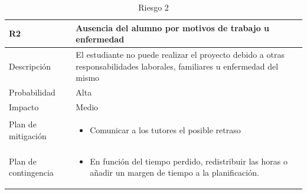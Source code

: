 \begin{table}[!htb]
    \footnotesize
    \begin{tabular}{|>{\arraybackslash}m{3.15cm} | >{\arraybackslash}m{10cm} |}
        \hline
        \vspace{0.5em} \textbf{ R2 } \vspace{0.5em} & \vspace{0.5em} \textbf{Ausencia del alumno por motivos de trabajo u enfermedad} \vspace{0.5em} \\
        \hline 
        \vspace{0.5em} Descripción \vspace{0.5em} & \vspace{0.5em} El estudiante no puede realizar el proyecto debido a otras responsabilidades laborales, familiares u enfermedad del mismo \vspace{0.5em} \\
        \hline
        \vspace{0.5em} Probabilidad \vspace{0.5em} & \vspace{0.5em} Alta \vspace{0.5em} \\
        \hline
        \vspace{0.5em} Impacto \vspace{0.5em} & \vspace{0.5em} Medio \vspace{0.5em} \\
        \hline
        Plan de mitigación & 
        \begin{itemize}
            \item Comunicar a los tutores el posible retraso
        \end{itemize} \\
        \hline
        Plan de contingencia & 
        \begin{itemize}
            \item En función del tiempo perdido, redistribuir las horas o añadir un margen de tiempo a la planificación.
        \end{itemize} \\
        \hline
    \end{tabular}
    \caption{Riesgo 2}
    \label{tabla:riesgo2}
\end{table}

